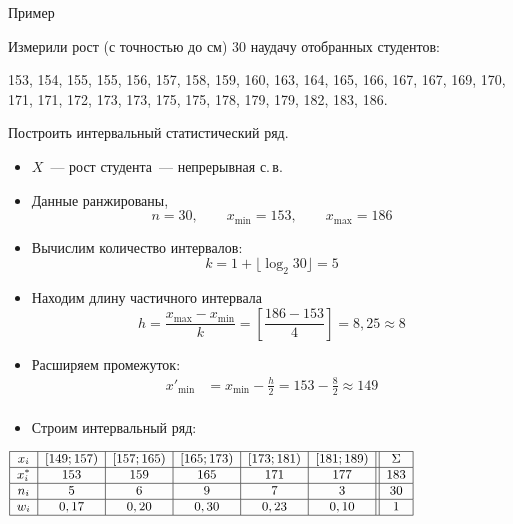 \documentclass[11pt,pdf,utf8,hyperref={unicode},aspectratio=169]{beamer}
\begin{document}
\begin{frame}[t,allowframebreaks]{Пример}{}
    \begin{exampleblock}{}
        Измерили рост (с точностью до см) 30 наудачу отобранных студентов:

        153, 154, 155, 155, 156, 157, 158, 159, 160, 163, 164, 165, 166, 167, 167, 169, 170, 171, 171, 172, 173, 173, 175, 175, 178, 179, 179, 182, 183, 186.

        Построить интервальный статистический ряд.
    \end{exampleblock}
    \begin{itemize}
        \item $X$~--- рост студента~--- непрерывная с.\,в.
        \item Данные ранжированы,
        $$
        n = 30, \qquad x_{\min}=153, \qquad x_{\max}=186
        $$
        \item Вычислим количество интервалов:
        $$
        k =  1+ \lfloor\log_2{30} \rfloor = 5
        $$
        \vspace{-5mm}
        \item  Находим длину частичного интервала
        $$
        h = \frac{x_{\max}-x_{\min}}{k} = \left[\frac{186-153}{4}\right] = 8,25 \approx 8
        $$

        \vspace{-2mm}
        \item Расширяем промежуток:
        \begin{align*}
            x'_{\min} &= x_{\min}-\frac{h}{2} = 153-\frac{8}{2} \approx 149\\
        \end{align*}
        \vspace{-4mm}
        \item Строим интервальный ряд:
    \end{itemize}
    $
    \small
    \begin{array}{|c|c|c|c|c|c||c|}
        \hline
        x_i & \left[149; 157 \right) &  \left[157; 165\right) &  \left[ 165; 173 \right) &  \left[ 173; 181 \right) &  \left[181; 189 \right) & \Sigma\\
        \hline
        x^*_i & 153 &  159 &  165 &  171 &  177 &  183 \\
        \hline
        n_i & 5 & 6 & 9 & 7 & 3 & 30\\
        \hline
        w_i & 0,17 & 0,20 & 0,30 & 0,23 & 0,10 & 1\\
        \hline
    \end{array}
    $
\end{frame}
\end{document}
